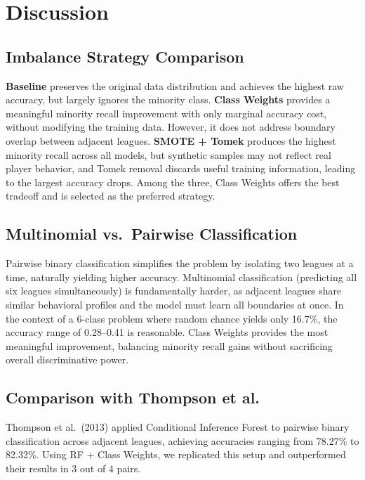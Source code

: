 \documentclass[12pt, a4paper]{article}
\begin{document}
\section{Discussion}

\subsection{Imbalance Strategy Comparison}

\textbf{Baseline} preserves the original data distribution and achieves the highest raw
accuracy, but largely ignores the minority class. \textbf{Class Weights} provides a
meaningful minority recall improvement with only marginal accuracy cost, without modifying
the training data. However, it does not address boundary overlap between adjacent leagues.
\textbf{SMOTE + Tomek} produces the highest minority recall across all models, but synthetic
samples may not reflect real player behavior, and Tomek removal discards useful training
information, leading to the largest accuracy drops. Among the three, Class Weights offers
the best tradeoff and is selected as the preferred strategy.

\subsection{Multinomial vs.\ Pairwise Classification}

Pairwise binary classification simplifies the problem by isolating two leagues at a time,
naturally yielding higher accuracy. Multinomial classification (predicting all six leagues
simultaneously) is fundamentally harder, as adjacent leagues share similar behavioral
profiles and the model must learn all boundaries at once. In the context of a 6-class
problem where random chance yields only 16.7\%, the accuracy range of 0.28--0.41 is
reasonable. Class Weights provides the most meaningful improvement, balancing minority
recall gains without sacrificing overall discriminative power.

\subsection{Comparison with Thompson et al.}

Thompson et al.\ (2013) applied Conditional Inference Forest to pairwise binary
classification across adjacent leagues, achieving accuracies ranging from 78.27\% to
82.32\%. Using RF + Class Weights, we replicated this setup and outperformed their
results in 3 out of 4 pairs.
\end{document}
